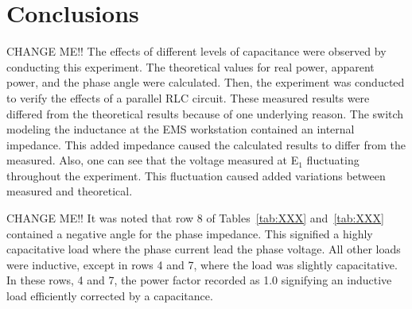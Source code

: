 \documentclass{article}
\begin{document}
\section{Conclusions}
CHANGE ME!!  The effects of different levels of capacitance were observed by
conducting this experiment. The theoretical values for real power, apparent
power, and the phase angle were calculated. Then, the experiment was conducted
to verify the effects of a parallel RLC circuit. These measured results were
differed from the theoretical results because of one underlying reason. The
switch modeling the inductance at the EMS workstation contained an internal
impedance.  This added impedance caused the calculated results to differ from
the measured.  Also, one can see that the voltage measured at E$_1$ fluctuating
throughout the experiment. This fluctuation caused added variations between
measured and theoretical.

CHANGE ME!!  It was noted that row 8 of Tables~\ref{tab:XXX} and~\ref{tab:XXX}
contained a negative angle for the phase impedance. This signified a highly
capacitative load where the phase current lead the phase voltage. All other
loads were inductive, except in rows 4 and 7, where the load was slightly
capacitative. In these rows, 4 and 7, the power factor recorded as 1.0
signifying an inductive load efficiently corrected by a capacitance.
\end{document}
